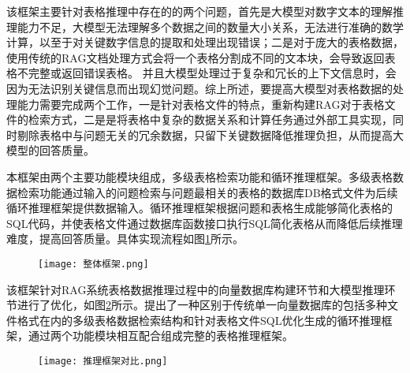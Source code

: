 该框架主要针对表格推理中存在的的两个问题，首先是大模型对数字文本的理解推理能力不足，大模型无法理解多个数据之间的数量大小关系，无法进行准确的数学计算，以至于对关键数字信息的提取和处理出现错误；二是对于庞大的表格数据，
使用传统的RAG文档处理方式会将一个表格分割成不同的文本块，会导致返回表格不完整或返回错误表格。
并且大模型处理过于复杂和冗长的上下文信息时，会因为无法识别关键信息而出现幻觉问题。综上所述，要提高大模型对表格数据的处理能力需要完成两个工作，一是针对表格文件的特点，重新构建RAG对于表格文件的检索方式，二是是将表格中复杂的数据关系和计算任务通过外部工具实现，同时剔除表格中与问题无关的冗余数据，只留下关键数据降低推理负担，从而提高大模型的回答质量。

本框架由两个主要功能模块组成，多级表格检索功能和循环推理框架。多级表格数据检索功能通过输入的问题检索与问题最相关的表格的数据库DB格式文件为后续循环推理框架提供数据输入。循环推理框架根据问题和表格生成能够简化表格的SQL代码，并使表格文件通过数据库函数接口执行SQL简化表格从而降低后续推理难度，提高回答质量。具体实现流程如图\ref{fig:4-1}所示。
\begin{figure}[h]
    \centering
    \texttt{[image: 整体框架.png]}
    \label{fig:4-1}
\end{figure}

该框架针对RAG系统表格数据推理过程中的向量数据库构建环节和大模型推理环节进行了优化，如图\ref{fig:4-2}所示。提出了一种区别于传统单一向量数据库的包括多种文件格式在内的多级表格数据检索结构和针对表格文件SQL优化生成的循环推理框架，通过两个功能模块相互配合组成完整的表格推理框架。
\begin{figure}[h]
    \centering
    \texttt{[image: 推理框架对比.png]}
    \label{fig:4-2}
\end{figure}

